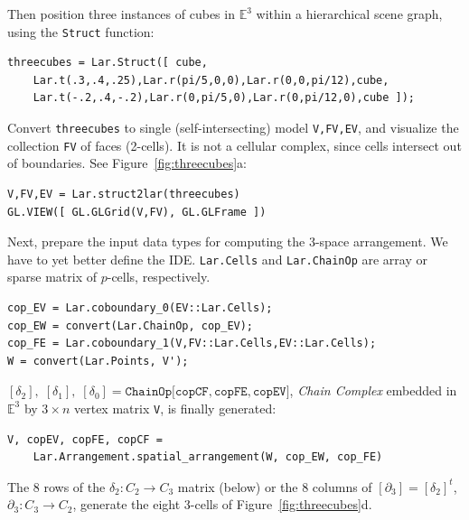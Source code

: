 \documentclass{juliacon}
\def\E{\mathbb{E}}
\begin{document}
Then position three instances of cubes in $\E^3$ within a hierarchical scene graph, using the \texttt{Struct} function:

{\footnotesize\begin{verbatim}
threecubes = Lar.Struct([ cube,
	Lar.t(.3,.4,.25),Lar.r(pi/5,0,0),Lar.r(0,0,pi/12),cube,
	Lar.t(-.2,.4,-.2),Lar.r(0,pi/5,0),Lar.r(0,pi/12,0),cube ]);
\end{verbatim}}

Convert \texttt{threecubes} to single (self-intersecting) model \texttt{V,FV,EV}, and visualize the collection \texttt{FV} of faces (2-cells). It is not a cellular complex, since cells intersect out of boundaries. See Figure~\ref{fig:threecubes}a:

{\footnotesize\begin{verbatim}
V,FV,EV = Lar.struct2lar(threecubes)
GL.VIEW([ GL.GLGrid(V,FV), GL.GLFrame ])
\end{verbatim}}

Next, prepare the input data types for computing the 3-space arrangement. 
We have to yet better define the  IDE. \texttt{Lar.Cells} and \texttt{Lar.ChainOp} are array or sparse matrix of $p$-cells, respectively.

{\footnotesize\begin{verbatim}
cop_EV = Lar.coboundary_0(EV::Lar.Cells);
cop_EW = convert(Lar.ChainOp, cop_EV);
cop_FE = Lar.coboundary_1(V,FV::Lar.Cells,EV::Lar.Cells);
W = convert(Lar.Points, V');
\end{verbatim}}

$[\delta_2],\;[\delta_1],\;[\delta_0]=\texttt{ChainOp[copCF}, \texttt{copFE}, \texttt{copEV]}$, \emph{Chain Complex} embedded in $\E^3$ by  $3\times n$ vertex matrix \texttt{V}, is finally generated:

{\footnotesize\begin{verbatim}
V, copEV, copFE, copCF = 
	Lar.Arrangement.spatial_arrangement(W, cop_EW, cop_FE)
\end{verbatim}}

The 8 rows of the $\delta_2: C_2\to C_3$ matrix (below) or the 8 columns of $[\partial_3]=[\delta_2]^t$, $\partial_3: C_3\to C_2$, generate the eight
3-cells of Figure~\ref{fig:threecubes}d.
\end{document}
